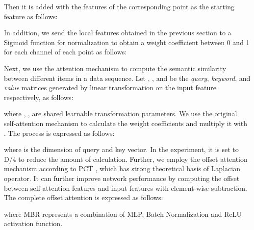 \documentclass[conference]{IEEEtran}
\begin{document}
Then it is added with the features of the corresponding point as the starting feature  as follows:

In addition, we send the local features obtained in the previous section to a Sigmoid function for normalization to obtain a weight coefficient  between 0 and 1 for each channel of each point as follows:

Next, we use the attention mechanism to compute the semantic similarity between different items in a data sequence. Let , , and  be the \textit{query}, \textit{keyword}, and \textit{value} matrices generated by linear transformation on the input feature   respectively, as follows:


where , ,  are shared learnable transformation parameters. We use the original self-attention mechanism to calculate the weight coefficients and multiply it with . The process is expressed as follows:

where  is the dimension of query and key vector. In the experiment, it is set to D/4 to reduce the amount of calculation. Further, we employ the offset attention mechanism according to PCT \cite{guo2021pct}, which has strong theoretical basis of Laplacian operator. It can further improve network performance by computing the offset between self-attention features and input features with element-wise subtraction. The complete offset attention is expressed as follows:

where MBR represents a combination of MLP, Batch Normalization and ReLU activation function.
\end{document}
